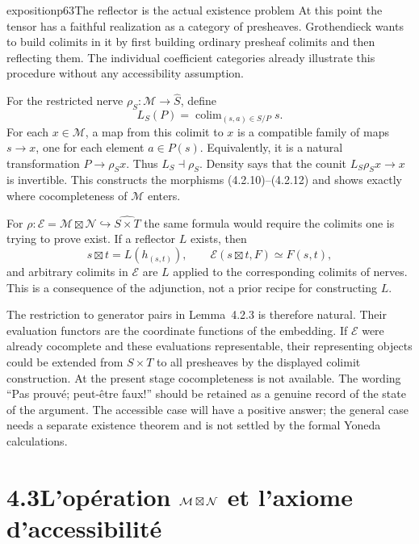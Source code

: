 \begin{dcomment}{exposition}{p63}{The reflector is the actual existence problem}
At this point the tensor has a faithful realization as a category of presheaves. Grothendieck wants to build colimits in it by first building ordinary presheaf colimits and then reflecting them. The individual coefficient categories already illustrate this procedure without any accessibility assumption.

For the restricted nerve $\rho_S:\mathcal M\to\widehat S$, define
\[
 L_S(P)=\mathop{\mathrm{colim}}_{(s,a)\in S/P}s.
\]
For each $x\in\mathcal M$, a map from this colimit to $x$ is a compatible family of maps $s\to x$, one for each element $a\in P(s)$. Equivalently, it is a natural transformation $P\to\rho_Sx$. Thus $L_S\dashv\rho_S$. Density says that the counit $L_S\rho_Sx\to x$ is invertible. This constructs the morphisms (4.2.10)--(4.2.12) and shows exactly where cocompleteness of $\mathcal M$ enters.

For $\rho:\mathcal E=\mathcal M\boxtimes\mathcal N\hookrightarrow\widehat{S\times T}$ the same formula would require the colimits one is trying to prove exist. If a reflector $L$ exists, then
\[
 s\boxtimes t=L(h_{(s,t)}),\qquad
 \mathcal E(s\boxtimes t,F)\simeq F(s,t),
\]
and arbitrary colimits in $\mathcal E$ are $L$ applied to the corresponding colimits of nerves. This is a consequence of the adjunction, not a prior recipe for constructing $L$.

The restriction to generator pairs in Lemma~4.2.3 is therefore natural. Their evaluation functors are the coordinate functions of the embedding. If $\mathcal E$ were already cocomplete and these evaluations representable, their representing objects could be extended from $S\times T$ to all presheaves by the displayed colimit construction. At the present stage cocompleteness is not available. The wording ``Pas prouv\'e; peut-\^etre faux!'' should be retained as a genuine record of the state of the argument. The accessible case will have a positive answer; the general case needs a separate existence theorem and is not settled by the formal Yoneda calculations.
\end{dcomment}


\section*{4.3\quad L'opération $\mathcal{M}\boxtimes\mathcal{N}$ et l'axiome d'accessibilité}

